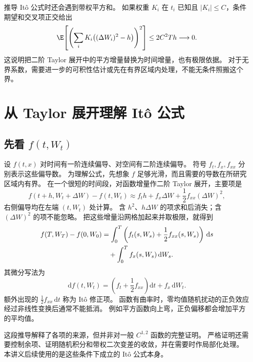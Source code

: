 推导 It\^o 公式时还会遇到带权平方和。
如果权重 $K_i$ 在 $t_i$ 已知且 $|K_i|\leq C$，条件期望和交叉项正交给出
\begin{equation}
  \E\!\left[\left(\sum_i K_i\big((\Delta W_i)^2-h\big)\right)^2\right]
  \leq 2C^2Th\longrightarrow0.
  \label{bg:eq:weighted-qv}
\end{equation}
这说明把二阶 Taylor 展开中的平方增量替换为时间增量，也有极限依据。
对于无界系数，需要进一步的可积性估计或先在有界区域内处理，不能无条件照搬这个界。

\section{从 Taylor 展开理解 It\^o 公式}
\label{bg:sec:ito-formula}

\subsection{先看 $f(t,W_t)$}
\label{bg:sub:ito-taylor}

设 $f(t,x)$ 对时间有一阶连续偏导、对空间有二阶连续偏导。
符号 $f_t,f_x,f_{xx}$ 分别表示这些偏导数。
为理解公式，先想象 $f$ 足够光滑，而且需要的导数在所研究区域内有界。
在一个很短的时间段，对函数增量作二阶 Taylor 展开，主要项是
\begin{equation}
  f(t+h,W_t+\Delta W)-f(t,W_t)
  \approx f_t h+f_x\Delta W+\frac12 f_{xx}(\Delta W)^2,
  \label{bg:eq:taylor-brownian}
\end{equation}
右侧偏导均在左端 $(t,W_t)$ 处计算。
含 $h^2$、$h\Delta W$ 的项求和后消失；含 $(\Delta W)^2$ 的项不能忽略。
把这些增量沿网格加起来并取极限，就得到
\begin{align}
  f(T,W_T)-f(0,W_0)
  &=\int_0^T\left(f_t(s,W_s)+\frac12 f_{xx}(s,W_s)\right)\,\mathrm ds
  \notag\\
  &\quad+\int_0^T f_x(s,W_s)\,\mathrm dW_s.
  \label{bg:eq:ito-brownian-integral}
\end{align}
其微分写法为
\begin{equation}
  \mathrm df(t,W_t)
  =\left(f_t+\frac12f_{xx}\right)\mathrm dt+f_x\,\mathrm dW_t.
  \label{bg:eq:ito-brownian-differential}
\end{equation}
额外出现的 $\frac12 f_{xx}\,\mathrm dt$ 称为 It\^o 修正项。
函数有曲率时，零均值随机扰动的正负效应经过非线性变换后通常不能抵消。
例如平方函数向上弯，正负偏移都会增加平方的平均值。

这段推导解释了各项的来源，但并非对一般 $C^{1,2}$ 函数的完整证明。
严格证明还需要控制余项、证明随机积分和带权二次变差的收敛，并在需要时作局部化处理。
本讲义后续使用的是这些条件下成立的 It\^o 公式本身。

